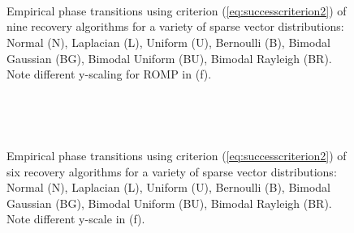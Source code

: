 \documentclass[11pt,draftcls,onecolumn]{IEEEtran}
\begin{document}
\begin{figure}[tb]
\centering
{}\hspace{-0.1in}
\\ \vspace{-0.1in}

\hspace{-0.1in}
\\ \vspace{-0.1in}

\hspace{-0.1in}
\\ \vspace{-0.1in}

\hspace{-0.1in}

\caption{Empirical phase transitions using criterion (\ref{eq:successcriterion2}) 
of nine recovery algorithms for a variety of sparse vector distributions:
Normal (N), Laplacian (L), Uniform (U), Bernoulli (B),
Bimodal Gaussian (BG), Bimodal Uniform (BU), Bimodal Rayleigh (BR).
Note different y-scaling for ROMP in (f).}
\label{fig:phasevsdistributions1}
\end{figure}

\begin{figure}[tb]
\centering
{}\hspace{-0.1in}
\\ \vspace{-0.1in}

 \hspace{-0.1in}
 \\ \vspace{-0.1in} 

\hspace{-0.1in}

\caption{Empirical phase transitions using criterion (\ref{eq:successcriterion2}) 
of six recovery algorithms for a variety of sparse vector distributions:
Normal (N), Laplacian (L), Uniform (U), Bernoulli (B),
Bimodal Gaussian (BG), Bimodal Uniform (BU), Bimodal Rayleigh (BR).
Note different y-scale in (f).}
\label{fig:phasevsdistributions2}
\end{figure}
\end{document}
